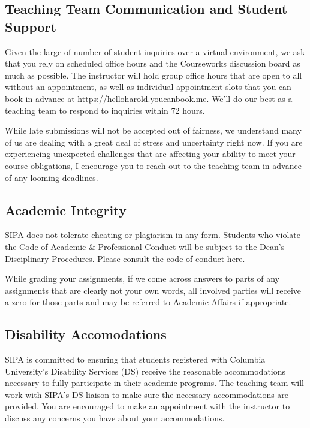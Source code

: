 \documentclass[11pt,]{article}
\begin{document}
\hypertarget{teaching-team-communication-and-student-support}{%
\subsection{Teaching Team Communication and Student
Support}\label{teaching-team-communication-and-student-support}}

Given the large of number of student inquiries over a virtual
environment, we ask that you rely on scheduled office hours and the
Courseworks discussion board as much as possible. The instructor will
hold group office hours that are open to all without an appointment, as
well as individual appointment slots that you can book in advance at
\url{https://helloharold.youcanbook.me}. We'll do our best as a teaching
team to respond to inquiries within 72 hours.

While late submissions will not be accepted out of fairness, we
understand many of us are dealing with a great deal of stress and
uncertainty right now. If you are experiencing unexpected challenges
that are affecting your ability to meet your course obligations, I
encourage you to reach out to the teaching team in advance of any
looming deadlines.

\hypertarget{academic-integrity}{%
\subsection{Academic Integrity}\label{academic-integrity}}

SIPA does not tolerate cheating or plagiarism in any form. Students who
violate the Code of Academic \& Professional Conduct will be subject to
the Dean's Disciplinary Procedures. Please consult the code of conduct
\href{http://bulletin.columbia.edu/sipa/academic-policies/discipline-procedures/index.html}{here}.

While grading your assignments, if we come across answers to parts of
any assignments that are clearly not your own words, all involved
parties will receive a zero for those parts and may be referred to
Academic Affairs if appropriate.

\hypertarget{disability-accomodations}{%
\subsection{Disability Accomodations}\label{disability-accomodations}}

SIPA is committed to ensuring that students registered with Columbia
University's Disability Services (DS) receive the reasonable
accommodations necessary to fully participate in their academic
programs. The teaching team will work with SIPA's DS liaison to make
sure the necessary accommodations are provided. You are encouraged to
make an appointment with the instructor to discuss any concerns you have
about your accommodations.
\end{document}

